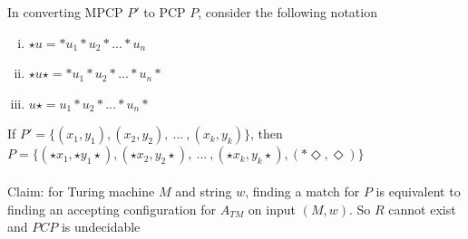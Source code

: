 \documentclass{article}
\newcommand*{\<}{\langle}
\renewcommand*{\>}{\rangle}
\begin{document}
			In converting MPCP $P'$ to PCP $P$, consider the following notation
			\begin{enumerate}[(i)]
				\item $\star u = *u_1*u_2*...*u_n$
				\item $\star u \star = *u_1*u_2*...*u_n*$
				\item $u \star = u_1*u_2*...*u_n*$
				\end{enumerate}
			If $P' = \{(x_1, y_1), (x_2, y_2),\:...\:, (x_k, y_k)\}$, then $P = \{(\star x_1, \star y_1 \star), (\star x_2, y_2 \star), \:...\:, (\star x_k, y_k \star), (*\Diamond, \Diamond)\}$ \\
			\\
			Claim: for Turing machine $M$ and string $w$, finding a match for $P$ is equivalent to finding an accepting configuration for $A_{TM}$ on input $(M, w)$. So $R$ cannot exist and $PCP$ is undecidable
\end{document}
